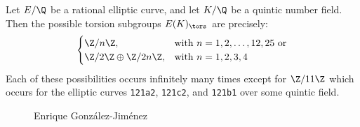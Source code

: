 \begin{frame}[plain]
\begin{thm}
Let $E/\Q$ be a rational elliptic curve, and let $K/\Q$ be a quintic number field. Then the possible torsion subgroups $E(K)_\tors$ are precisely:
	\[
	\begin{cases}
	\Z/n\Z, & \text{with } n= 1, 2, \ldots, 12, 25 \text{ or} \\
	\Z/2\Z \oplus \Z/2n\Z, & \text{with } n= 1, 2, 3, 4
	\end{cases}
	\]
Each of these possibilities occurs infinitely many times except for $\Z/11\Z$ which occurs for the elliptic curves \texttt{121a2}, \texttt{121c2}, and \texttt{121b1} over some quintic field. 
\end{thm}
	\begin{figure}[!ht]
	\centering
	\captionsetup{labelformat=empty}
	\caption{Enrique Gonz\'alez-Jim\'enez}
	\end{figure}
\end{frame}





